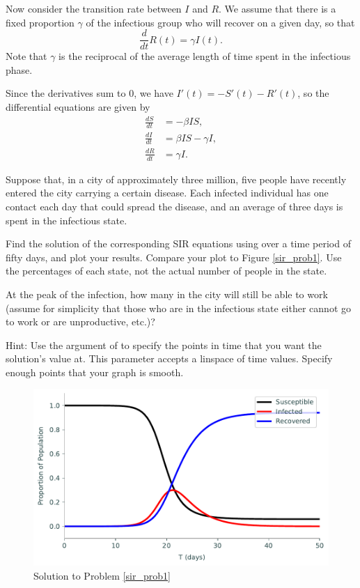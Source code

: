 Now consider the transition rate between $I$ and $R$.
We assume that there is a fixed proportion $\gamma$ of the infectious group who will recover on a given day, so that
\[\frac{d}{dt}R(t) = \gamma I(t).\]
Note that $\gamma$ is the reciprocal of the average length of time spent in the infectious phase.

Since the derivatives sum to $0$, we have $I'(t) = - S'(t) - R'(t)$, so the  differential equations are given by
\begin{align}
\frac{dS}{dt} &=-\beta IS ,\\
\frac{dI}{dt} &= \beta I S-\gamma I,\\
\frac{dR}{dt} &=\gamma I.
\end{align}

\begin{problem}\label{sir_prob1}
Suppose that, in a city of approximately three million, five people have recently entered the city carrying a certain disease.
Each infected individual has one contact each day that could spread the disease, and an average of three days is spent in the infectious state.

Find the solution of the corresponding SIR equations using  over a time period of fifty days, and plot your results.
Compare your plot to Figure \ref{sir_prob1}.
Use the percentages of each state, not the actual number of people in the state.

At the peak of the infection, how many in the city will still be able to work (assume for simplicity that those who are in the infectious state either cannot go to work or are unproductive, etc.)?

Hint: Use the  argument of  to specify the points in time that you want the solution's value at.
This parameter accepts a linspace of time values.
Specify enough points that your graph is smooth.
\end{problem}

\begin{figure}[H]
\centering
\includegraphics[width=\textwidth]{figures/SIR1.pdf}
\caption{Solution to Problem \ref{sir_prob1}}
\label{sir1}
\end{figure}

